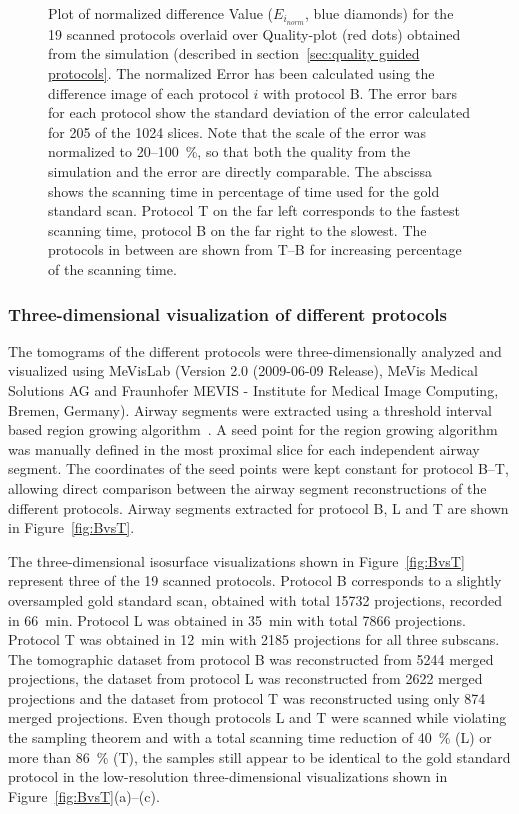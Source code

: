 \documentclass[preprint,s]{iucr}
\begin{document}
\begin{figure}
	\centering
	\caption{Plot of normalized difference Value ($E_{i_{norm}}$, blue diamonds) for the 19 scanned protocols overlaid over Quality-plot (red dots) obtained from the simulation (described in section~\ref{sec:quality guided protocols}. The normalized Error has been calculated using the difference image of each protocol $i$ with protocol B. The error bars for each protocol show the standard deviation of the error calculated for 205 of the 1024 slices. Note that the scale of the error was normalized to 20--\SI{100}{\percent}, so that both the quality from the simulation and the error are directly comparable. The abscissa shows the scanning time in percentage of time used for the gold standard scan. Protocol T on the far left corresponds to the fastest scanning time, protocol B on the far right to the slowest. The protocols in between are shown from T--B for increasing percentage of the scanning time.}
	
	\label{fig:NormalizedErrorPlot}
\end{figure}

\subsubsection{Three-dimensional visualization of different protocols}
\label{subsec:comparison}
The tomograms of the different protocols were three-dimensionally analyzed and visualized using MeVisLab (Version 2.0 (2009-06-09 Release), MeVis Medical Solutions AG and Fraunhofer MEVIS - Institute for Medical Image Computing, Bremen, Germany). Airway segments were extracted using a threshold interval based region growing algorithm~\cite{Zucker1976}. A seed point for the region growing algorithm was manually defined in the most proximal slice for each independent airway segment. The coordinates of the seed points were kept constant for protocol B--T, allowing direct comparison between the airway segment reconstructions of the different protocols. Airway segments extracted for protocol B, L and T are shown in Figure~\ref{fig:BvsT}.

The three-dimensional isosurface visualizations shown in Figure~\ref{fig:BvsT} represent three of the 19 scanned protocols. Protocol B corresponds to a slightly oversampled gold standard scan, obtained with total 15732 projections, recorded in \SI{66}{\minute}. Protocol L was obtained in \SI{35}{\minute} with total 7866 projections. Protocol T was obtained in \SI{12}{\minute} with 2185 projections for all three subscans. The tomographic dataset from protocol B was reconstructed from 5244 merged projections, the dataset from protocol L was reconstructed from 2622 merged projections and the dataset from protocol T was reconstructed using only 874 merged projections. Even though protocols L and T were scanned while violating the sampling theorem and with a total scanning time reduction of \SI{40}{\percent} (L) or more than \SI{86}{\percent} (T), the samples still appear to be identical to the gold standard protocol in the low-resolution three-dimensional visualizations shown in Figure~\ref{fig:BvsT}(a)--(c).
\end{document}
